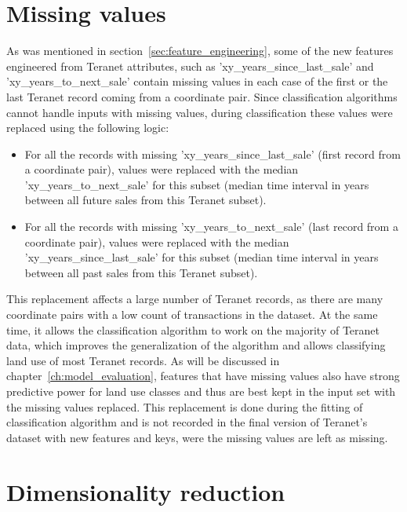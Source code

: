 \section{Missing values} \label{sec:missing_values}

As was mentioned in section~\ref{sec:feature_engineering}, some of the new features engineered from Teranet attributes, such as 'xy\_years\_since\_last\_sale' and 'xy\_years\_to\_next\_sale' contain missing values in each case of the first or the last Teranet record coming from a coordinate pair.
Since classification algorithms cannot handle inputs with missing values, during classification these values were replaced using the following logic:

\begin{itemize}
    \item For all the records with missing 'xy\_years\_since\_last\_sale' (first record from a coordinate pair), values were replaced with the median 'xy\_years\_to\_next\_sale' for this subset (median time interval in years between all future sales from this Teranet subset).
    \item For all the records with missing 'xy\_years\_to\_next\_sale' (last record from a coordinate pair), values were replaced with the median 'xy\_years\_since\_last\_sale' for this subset (median time interval in years between all past sales from this Teranet subset).
\end{itemize}

This replacement affects a large number of Teranet records, as there are many coordinate pairs with a low count of transactions in the dataset.
At the same time, it allows the classification algorithm to work on the majority of Teranet data, which improves the generalization of the algorithm and allows classifying land use of most Teranet records.
As will be discussed in chapter~\ref{ch:model_evaluation}, features that have missing values also have strong predictive power for land use classes and thus are best kept in the input set with the missing values replaced.
This replacement is done during the fitting of classification algorithm and is not recorded in the final version of Teranet's dataset with new features and keys, were the missing values are left as missing.

\section{Dimensionality reduction} \label{sec:dimensionality_reduction}

